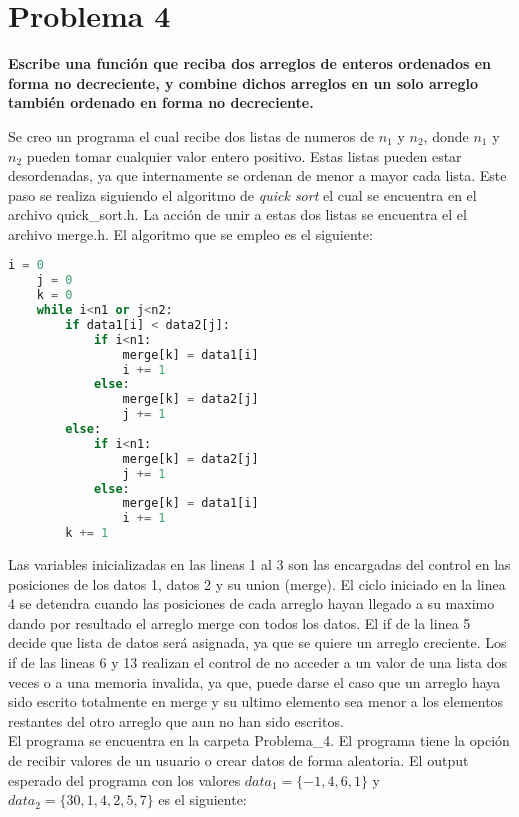 \section*{Problema 4}
\textbf{Escribe una función que reciba dos arreglos de enteros ordenados en forma no decreciente, y combine dichos arreglos en un solo arreglo también ordenado en forma no decreciente.}

Se creo un programa el cual recibe dos listas de numeros de $n_1$ y $n_2$, donde $n_1$ y $n_2$ pueden tomar cualquier valor entero positivo. Estas listas pueden estar desordenadas, ya que internamente se ordenan de menor a mayor cada lista. Este paso se realiza siguiendo el algoritmo de \textit{quick sort} el cual se encuentra en el archivo \textcolor{title}{quick\_sort.h}. La acción de unir a estas dos listas se encuentra el el archivo \textcolor{title}{merge.h}. El algoritmo que se empleo es el siguiente:

\begin{lstlisting}[language=python]
    i = 0
    j = 0
    k = 0
    while i<n1 or j<n2:
        if data1[i] < data2[j]:
            if i<n1:
                merge[k] = data1[i]
                i += 1
            else:
                merge[k] = data2[j]
                j += 1
        else:
            if i<n1:
                merge[k] = data2[j]
                j += 1
            else:
                merge[k] = data1[i]
                i += 1
        k += 1
\end{lstlisting}

Las variables inicializadas en las lineas 1 al 3 son las encargadas del control en las posiciones de los datos 1, datos 2 y su union (merge). El ciclo iniciado en la linea 4 se detendra cuando las posiciones de cada arreglo hayan llegado a su maximo dando por resultado el arreglo merge con todos los datos. El if de la linea 5 decide que lista de datos será asignada, ya que se quiere un arreglo creciente. Los if de las lineas 6 y 13 realizan el control de no acceder a un valor de una lista dos veces o a una memoria invalida, ya que, puede darse el caso que un arreglo haya sido escrito totalmente en merge y su ultimo elemento sea menor a los elementos restantes del otro arreglo que aun no han sido escritos.\\

El programa se encuentra en la carpeta \textcolor{citecolor}{Problema\_4}.
El programa tiene la opción de recibir valores de un usuario o crear datos de forma aleatoria. El output esperado del programa con los valores $data_1=\{-1,4,6,1\}$ y $data_2=\{30,1,4,2,5,7\}$ es el siguiente:

